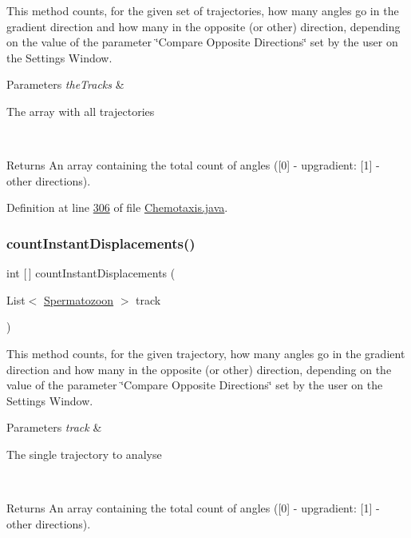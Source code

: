 This method counts, for the given set of trajectories, how many angles go in the gradient direction and how many in the opposite (or other) direction, depending on the value of the parameter \char`\"{}\+Compare Opposite
\+Directions\char`\"{} set by the user on the Settings Window.


\begin{DoxyParams}{Parameters}
{\em the\+Tracks} & 
\begin{DoxyItemize}
\item The array with all trajectories 
\end{DoxyItemize}\\
\hline
\end{DoxyParams}
\begin{DoxyReturn}{Returns}
An array containing the total count of angles (\mbox{[}0\mbox{]} -\/ upgradient\+: \mbox{[}1\mbox{]} -\/ other directions). 
\end{DoxyReturn}


Definition at line \hyperlink{_chemotaxis_8java_source_l00306}{306} of file \hyperlink{_chemotaxis_8java_source}{Chemotaxis.\+java}.

\hypertarget{classanalysis_1_1_chemotaxis_a668ad1c1240012d6fb70c1fac4a219be}{}\label{classanalysis_1_1_chemotaxis_a668ad1c1240012d6fb70c1fac4a219be} 
\subsubsection{\texorpdfstring{count\+Instant\+Displacements()}{countInstantDisplacements()}}
{\footnotesize\ttfamily int \mbox{[}$\,$\mbox{]} count\+Instant\+Displacements (\begin{DoxyParamCaption}\item[{List$<$ \hyperlink{classdata_1_1_spermatozoon}{Spermatozoon} $>$}]{track }\end{DoxyParamCaption})\hspace{0.3cm}{\ttfamily [private]}}

This method counts, for the given trajectory, how many angles go in the gradient direction and how many in the opposite (or other) direction, depending on the value of the parameter \char`\"{}\+Compare Opposite Directions\char`\"{} set by the user on the Settings Window.


\begin{DoxyParams}{Parameters}
{\em track} & 
\begin{DoxyItemize}
\item The single trajectory to analyse 
\end{DoxyItemize}\\
\hline
\end{DoxyParams}
\begin{DoxyReturn}{Returns}
An array containing the total count of angles (\mbox{[}0\mbox{]} -\/ upgradient\+: \mbox{[}1\mbox{]} -\/ other directions). 
\end{DoxyReturn}


